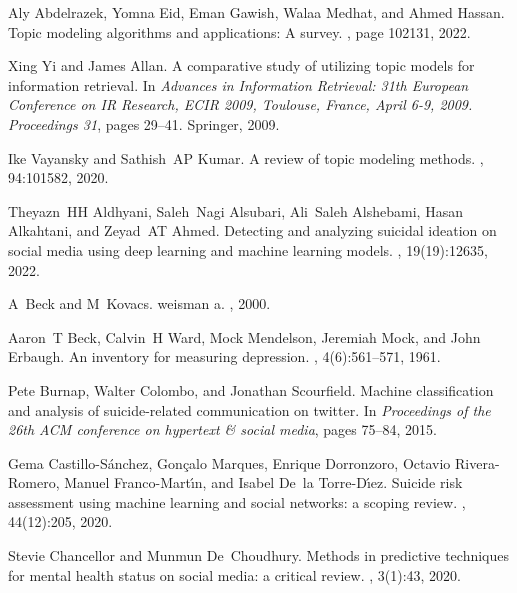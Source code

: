 \begin{thebibliography}{10}
Aly Abdelrazek, Yomna Eid, Eman Gawish, Walaa Medhat, and Ahmed Hassan.
\newblock Topic modeling algorithms and applications: A survey.
, page 102131, 2022.

Xing Yi and James Allan.
\newblock A comparative study of utilizing topic models for information
  retrieval.
\newblock In {\em Advances in Information Retrieval: 31th European Conference
  on IR Research, ECIR 2009, Toulouse, France, April 6-9, 2009. Proceedings
  31}, pages 29--41. Springer, 2009.
  
Ike Vayansky and Sathish~AP Kumar.
\newblock A review of topic modeling methods.
, 94:101582, 2020.

      
Theyazn~HH Aldhyani, Saleh~Nagi Alsubari, Ali~Saleh Alshebami, Hasan Alkahtani,
  and Zeyad~AT Ahmed.
\newblock Detecting and analyzing suicidal ideation on social media using deep
  learning and machine learning models.
, 19(19):12635, 2022.

A~Beck and M~Kovacs.
\newblock weisman a.
, 2000.

Aaron~T Beck, Calvin~H Ward, Mock Mendelson, Jeremiah Mock, and John Erbaugh.
\newblock An inventory for measuring depression.
, 4(6):561--571, 1961.

Pete Burnap, Walter Colombo, and Jonathan Scourfield.
\newblock Machine classification and analysis of suicide-related communication
  on twitter.
\newblock In {\em Proceedings of the 26th ACM conference on hypertext \& social
  media}, pages 75--84, 2015.

Gema Castillo-S{\'a}nchez, Gon{\c{c}}alo Marques, Enrique Dorronzoro, Octavio
  Rivera-Romero, Manuel Franco-Mart{\'\i}n, and Isabel De~la Torre-D{\'\i}ez.
\newblock Suicide risk assessment using machine learning and social networks: a
  scoping review.
, 44(12):205, 2020.

Stevie Chancellor and Munmun De~Choudhury.
\newblock Methods in predictive techniques for mental health status on social
  media: a critical review.
, 3(1):43, 2020.


\end{thebibliography}
